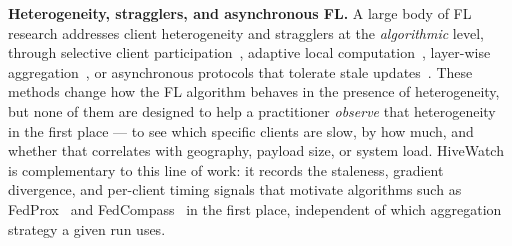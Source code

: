 \textbf{Heterogeneity, stragglers, and asynchronous FL.} A large body of FL research addresses client heterogeneity and stragglers at the \emph{algorithmic} level, through selective client participation~\cite{lai2021oort, wolfrath2022haccs}, adaptive local computation~\cite{li2020federated, diao2020heterofl, li2024fedcompass}, layer-wise aggregation~\cite{lang2024stragglers}, or asynchronous protocols that tolerate stale updates~\cite{xie2019asynchronous, nguyen2022federated, iakovidou2024asynchronous}. These methods change how the FL algorithm behaves in the presence of heterogeneity, but none of them are designed to help a practitioner \emph{observe} that heterogeneity in the first place — to see which specific clients are slow, by how much, and whether that correlates with geography, payload size, or system load. HiveWatch is complementary to this line of work: it records the staleness, gradient divergence, and per-client timing signals that motivate algorithms such as FedProx~\cite{li2020federated} and FedCompass~\cite{li2024fedcompass} in the first place, independent of which aggregation strategy a given run uses.

